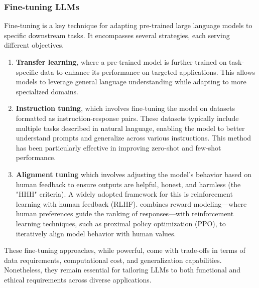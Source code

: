 \subsubsection*{Fine-tuning LLMs}
Fine-tuning is a key technique for adapting pre-trained large language models to specific downstream tasks. It encompasses several strategies, each serving different objectives\citep{touvron2023llama}. 
\begin{enumerate} 
	\item \textbf{Transfer learning}, where a pre-trained model is further trained on task-specific data to enhance its performance on targeted applications. This allows models to leverage general language understanding while adapting to more specialized domains.
	\item \textbf{Instruction tuning}, which involves fine-tuning the model on datasets formatted as instruction-response pairs. These datasets typically include multiple tasks described in natural language, enabling the model to better understand prompts and generalize across various instructions. This method has been particularly effective in improving zero-shot and few-shot performance.
	\item \textbf{Alignment tuning} which involves adjusting the model’s behavior based on human feedback to ensure outputs are helpful, honest, and harmless (the "HHH" criteria). A widely adopted framework for this is reinforcement learning with human feedback (RLHF).  combines reward modeling—where human preferences guide the ranking of responses—with reinforcement learning techniques, such as proximal policy optimization (PPO), to iteratively align model behavior with human values.


\end{enumerate}
These fine-tuning approaches, while powerful, come with trade-offs in terms of data requirements, computational cost, and generalization capabilities. Nonetheless, they remain essential for tailoring LLMs to both functional and ethical requirements across diverse applications.
